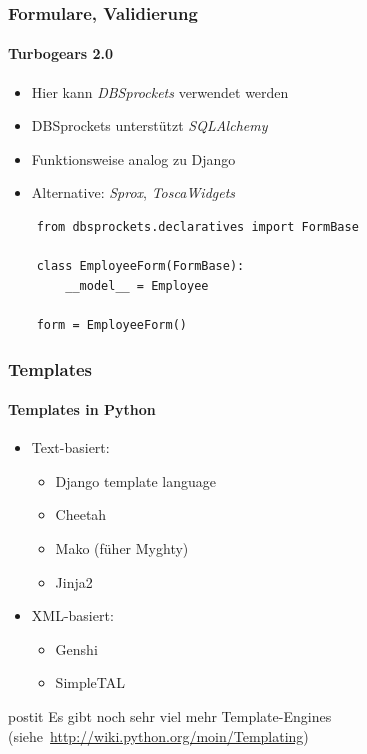 \documentclass[
    t,
    smaller,
    compress,
    xcolor=svgnames,            %
    table,
]{beamer}
\newenvironment{beamerpostit}[1]%
{\begin{beamercolorbox}[wd=\textwidth,sep=2pt,rounded=true,shadow=true]{postit} #1}%
{\end{beamercolorbox}}%
\begin{document}
\begin{frame}[fragile]
  \frametitle{Formulare, Validierung}
  \framesubtitle{Turbogears 2.0}

  \begin{itemize}[<1->]
     \item Hier kann \textit{DBSprockets} verwendet werden
     \item DBSprockets unterstützt \textit{SQLAlchemy}
     \item Funktionsweise analog zu Django
     \item Alternative: \textit{Sprox}, \textit{ToscaWidgets}
  \end{itemize}
  \begin{lstlisting}
    from dbsprockets.declaratives import FormBase

    class EmployeeForm(FormBase):
        __model__ = Employee

    form = EmployeeForm()
  \end{lstlisting}
\end{frame}


\begin{frame}
  \frametitle{Templates}
  \framesubtitle{Templates in Python}

  \begin{itemize}[<1->]
    \item Text-basiert:
        \begin{itemize}[<1->]
            \item Django template language
            \item Cheetah
            \item Mako (füher Myghty)
            \item Jinja2
        \end{itemize}
    \item XML-basiert:
        \begin{itemize}[<1->]
            \item Genshi
            \item SimpleTAL
        \end{itemize}
  \end{itemize}

  \vspace{12pt}
  \begin{beamerpostit}
    Es gibt noch sehr viel mehr Template-Engines
    (siehe~\url{http://wiki.python.org/moin/Templating})
  \end{beamerpostit}

\end{frame}
\end{document}
